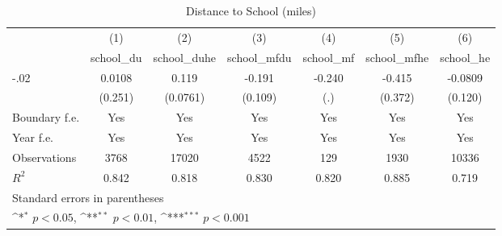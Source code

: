 \begin{table}[htbp]\centering
\def\sym#1{\ifmmode^{#1}\else\(^{#1}\)\fi}
\caption{Distance to School (miles)}
\begin{tabular}{l*{6}{c}}
\hline\hline
                    &\multicolumn{1}{c}{(1)}&\multicolumn{1}{c}{(2)}&\multicolumn{1}{c}{(3)}&\multicolumn{1}{c}{(4)}&\multicolumn{1}{c}{(5)}&\multicolumn{1}{c}{(6)}\\
                    &\multicolumn{1}{c}{school\_du}&\multicolumn{1}{c}{school\_duhe}&\multicolumn{1}{c}{school\_mfdu}&\multicolumn{1}{c}{school\_mf}&\multicolumn{1}{c}{school\_mfhe}&\multicolumn{1}{c}{school\_he}\\
\hline
-.02                &      0.0108         &       0.119         &      -0.191         &      -0.240         &      -0.415         &     -0.0809         \\
                    &     (0.251)         &    (0.0761)         &     (0.109)         &         (.)         &     (0.372)         &     (0.120)         \\
[1em]
Boundary f.e.       &         Yes         &         Yes         &         Yes         &         Yes         &         Yes         &         Yes         \\
[1em]
Year f.e.           &         Yes         &         Yes         &         Yes         &         Yes         &         Yes         &         Yes         \\
\hline
Observations        &        3768         &       17020         &        4522         &         129         &        1930         &       10336         \\
\(R^{2}\)           &       0.842         &       0.818         &       0.830         &       0.820         &       0.885         &       0.719         \\
\hline\hline
\multicolumn{7}{l}{\footnotesize Standard errors in parentheses}\\
\multicolumn{7}{l}{\footnotesize \sym{*} \(p<0.05\), \sym{**} \(p<0.01\), \sym{***} \(p<0.001\)}\\
\end{tabular}
\end{table}
